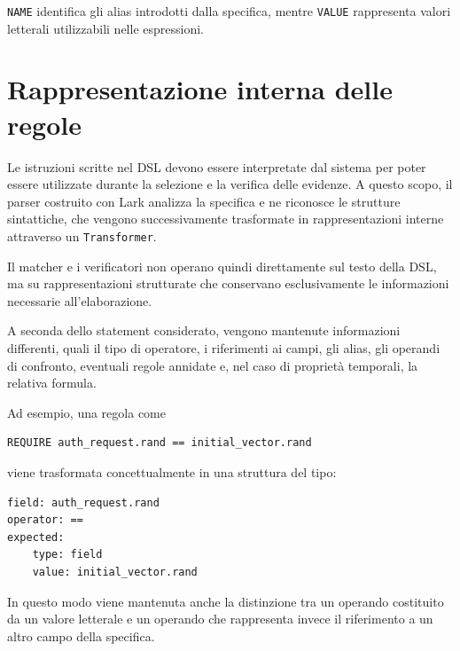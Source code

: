 \texttt{NAME} identifica gli alias introdotti dalla specifica, mentre \texttt{VALUE} rappresenta valori letterali utilizzabili nelle espressioni. 



\section{Rappresentazione interna delle regole}\label{rappresentazione-interna-delle-regole}

Le istruzioni scritte nel DSL devono essere interpretate dal sistema per poter essere utilizzate durante la selezione e la verifica delle evidenze. A questo scopo, il parser costruito con Lark analizza la specifica e ne riconosce le strutture sintattiche, che vengono successivamente trasformate in rappresentazioni interne attraverso un \texttt{Transformer}.

Il matcher e i verificatori non operano quindi direttamente sul testo della DSL, ma su rappresentazioni strutturate che conservano esclusivamente le informazioni necessarie all'elaborazione.

A seconda dello statement considerato, vengono mantenute informazioni differenti, quali il tipo di operatore, i riferimenti ai campi, gli alias, gli operandi di confronto, eventuali regole annidate e, nel caso di proprietà temporali, la relativa formula.

Ad esempio, una regola come

\par\noindent\begin{minipage}{\linewidth}
\begin{lstlisting}
REQUIRE auth_request.rand == initial_vector.rand
\end{lstlisting}
\end{minipage}\par

viene trasformata concettualmente in una struttura del tipo:

\par\noindent\begin{minipage}{\linewidth}
\begin{lstlisting}
field: auth_request.rand
operator: ==
expected:
    type: field
    value: initial_vector.rand
\end{lstlisting}
\end{minipage}\par

In questo modo viene mantenuta anche la distinzione tra un operando costituito da un valore letterale e un operando che rappresenta invece il riferimento a un altro campo della specifica.

